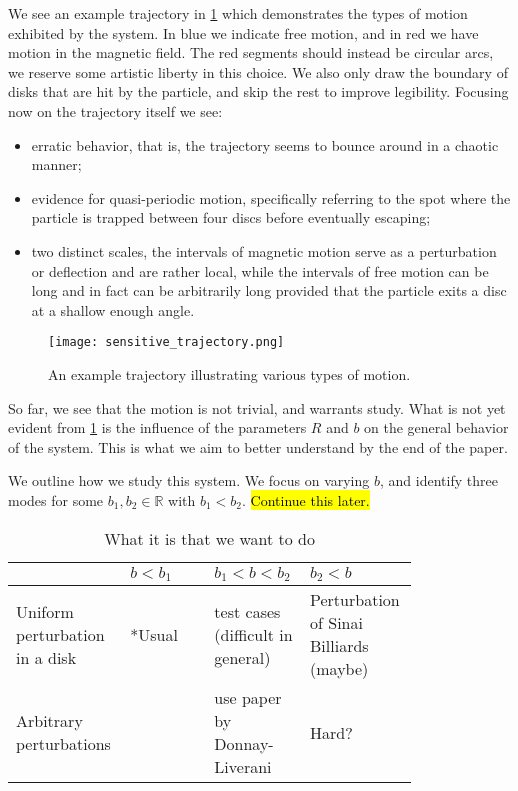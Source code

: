 We see an example trajectory in \cref{fig:sensitive_trajectory} which demonstrates the types of motion exhibited by the system. In blue we indicate free motion, and in red we have motion in the magnetic field. The red segments should instead be circular arcs, we reserve some artistic liberty in this choice. We also only draw the boundary of disks that are hit by the particle, and skip the rest to improve legibility. Focusing now on the trajectory itself we see:
\begin{itemize}
\item erratic behavior, that is, the trajectory seems to bounce around in a chaotic manner;
\item evidence for quasi-periodic motion, specifically referring to the spot where the particle is trapped between four discs before eventually escaping;
\item two distinct scales, the intervals of magnetic motion serve as a perturbation or deflection and are rather local, while the intervals of free motion can be long and in fact can be arbitrarily long provided that the particle exits a disc at a shallow enough angle.
\end{itemize}
 
\begin{figure}[!th]
\centering
\texttt{[image: sensitive\_trajectory.png]}
\caption{An example trajectory illustrating various types of motion.}
\label{fig:sensitive_trajectory}
\end{figure}
So far, we see that the motion is not trivial, and warrants study. What is not yet evident from \cref{fig:sensitive_trajectory} is the influence of the parameters $R$ and $b$ on the general behavior of the system. This is what we aim to better understand by the end of the paper. 


We outline how we study this system. We focus on varying $b$, and identify three modes for some $b_1,b_2\in\mathbb R$ with $b_1<b_2$. \hl{Continue this later.}



\begin{table}[!ht]
\centering
\renewcommand\arraystretch{2}
\begin{tabular}{>{\raggedright}p{0.2\linewidth}
				>{\raggedright}p{0.2\linewidth}
				>{\raggedright}p{0.2\linewidth}
				>{\raggedright\arraybackslash}p{0.2\linewidth}
                }
\toprule
 & $b<b_1$ & $b_1<b<b_2$ & $b_2<b$ \\
\midrule
Uniform perturbation in a disk 
  & \multirow{2}*{Usual } 
  & test cases (difficult in general)
  & Perturbation of Sinai Billiards (maybe) \\
Arbitrary perturbations
  & 
  & use paper by Donnay-Liverani
  & Hard?\\
\bottomrule
\end{tabular}
\caption{What it is that we want to do}
\label{tab:outline}
\end{table}




